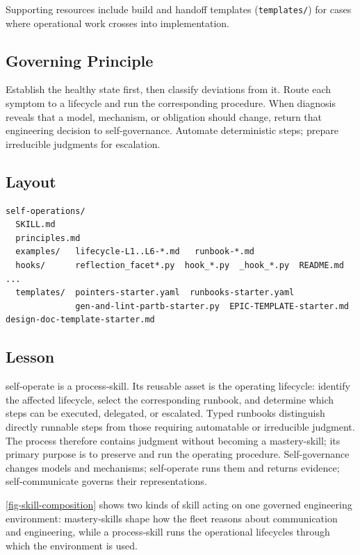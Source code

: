 Supporting resources include build and handoff templates (\texttt{templates/}) for cases where operational work crosses into implementation.

\subsection{Governing Principle}\label{heading:governing-principle-2}

Establish the healthy state first, then classify deviations from it. Route each symptom to a lifecycle and run the corresponding procedure. When diagnosis reveals that a model, mechanism, or obligation should change, return that engineering decision to self-governance. Automate deterministic steps; prepare irreducible judgments for escalation.

\subsection{Layout}\label{heading:layout-2}

\begin{verbatim}
self-operations/
  SKILL.md
  principles.md
  examples/   lifecycle-L1..L6-*.md   runbook-*.md
  hooks/      reflection_facet*.py  hook_*.py  _hook_*.py  README.md  ...
  templates/  pointers-starter.yaml  runbooks-starter.yaml
              gen-and-lint-partb-starter.py  EPIC-TEMPLATE-starter.md  design-doc-template-starter.md
\end{verbatim}

\subsection{Lesson}\label{heading:lesson-2}

self-operate is a process-skill. Its reusable asset is the operating lifecycle: identify the affected lifecycle, select the corresponding runbook, and determine which steps can be executed, delegated, or escalated. Typed runbooks distinguish directly runnable steps from those requiring automatable or irreducible judgment. The process therefore contains judgment without becoming a mastery-skill; its primary purpose is to preserve and run the operating procedure. Self-governance changes models and mechanisms; self-operate runs them and returns evidence; self-communicate governs their representations.

\autoref{fig-skill-composition} shows two kinds of skill acting on one governed engineering environment: mastery-skills shape how the fleet reasons about communication and engineering, while a process-skill runs the operational lifecycles through which the environment is used.

